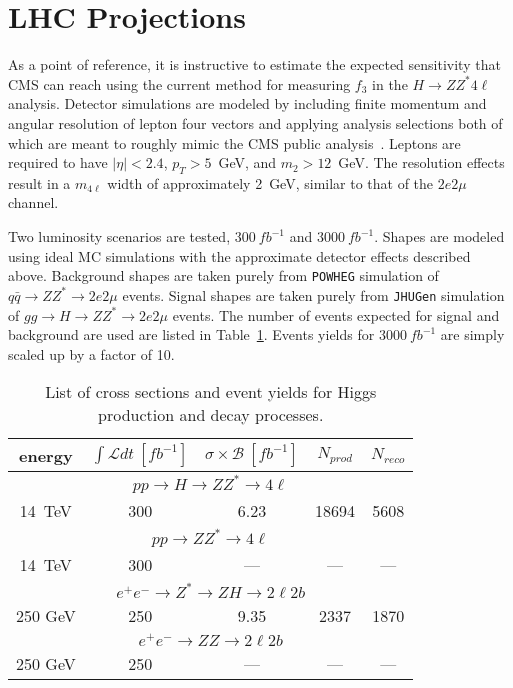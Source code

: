 \section{LHC Projections}

As a point of reference, it is instructive to estimate the
expected sensitivity that CMS can reach using the current method
for measuring $f_3$ in the $H\to ZZ^*4\ell$ analysis.  Detector
simulations are modeled by 
including finite momentum and angular resolution of lepton
four vectors and applying analysis selections both of which are
meant to roughly mimic the CMS public analysis~\cite{CMS:xwa}.
Leptons are
required to have $|\eta|<2.4$, $p_T>5$~GeV, and $m_2>12$~GeV.
The resolution effects result in a $m_{4\ell}$ width of
approximately 2~GeV, similar to that of the $2e2\mu$ channel.  

Two luminosity scenarios are tested, $300~fb^{-1}$ and 
$3000~fb^{-1}$.  Shapes are modeled using ideal MC simulations
with the approximate detector effects described above.
Background shapes are taken purely from \verb+POWHEG+ simulation
of $q\bar{q}\to ZZ^*\to 2e2\mu$ events.  Signal shapes are
taken purely from \verb+JHUGen+ simulation of 
$gg\to H\to ZZ^*\to 2e2\mu$ events.  
The number of events expected for signal and background are 
used are listed in Table~\ref{table:FutureMeasEventYields}.
Events yields for $3000~fb^{-1}$ are simply scaled up by 
a factor of 10. 

\begin{table}
\begin{center}
\begin{tabular}{ccccc}
\hline 
\hline
energy & $\int \mathscr{L}dt~[fb^{-1}]$ & 
$\sigma\times\mathscr{B}~[fb^{-1}]$ & $N_{prod}$ & $N_{reco}$ \\ 
\hline
\hline
\multicolumn{5}{c}{$pp\to H \to ZZ^* \to 4\ell$}  \\
\hline
14~TeV & 300  &  6.23 & 18694 & 5608 \\
\hline
\multicolumn{5}{c}{$pp\to ZZ^* \to 4\ell$}  \\
\hline
14~TeV & 300 &  --- & --- & --- \\
\hline
\multicolumn{5}{c}{$e^+e^-\to Z^* \to ZH \to 2\ell 2b$} \\
\hline
250 GeV & 250 & 9.35 & 2337 & 1870 \\
\hline
\multicolumn{5}{c}{$e^+e^-\to ZZ \to 2\ell 2b$} \\
\hline
250 GeV & 250 & --- & --- & --- \\
\hline
\hline
\end{tabular}
\end{center}
\label{table:FutureMeasEventYields}
\caption{List of cross sections and event yields for Higgs
production and decay processes.}
\end{table}

